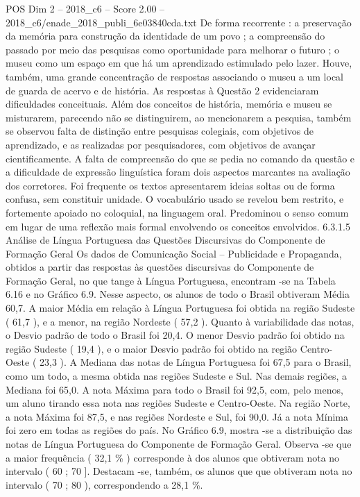 \begin{textsample}{POS Dim 2 – 2018\_c6 – Score 2.00 – 2018\_c6/enade\_2018\_publi\_6e03840cda.txt}
De forma recorrente : a preservação da memória para construção da identidade de um povo ; a compreensão do passado por meio das pesquisas como oportunidade para melhorar o futuro ; o museu como um espaço em que há um aprendizado estimulado pelo lazer.
Houve, também, uma grande concentração de respostas associando o museu a um local de guarda de acervo e de história.
As respostas à Questão 2 evidenciaram dificuldades conceituais.
Além dos conceitos de história, memória e museu se misturarem, parecendo não se distinguirem, ao mencionarem a pesquisa, também se observou falta de distinção entre pesquisas colegiais, com objetivos de aprendizado, e as realizadas por pesquisadores, com objetivos de avançar cientificamente.
A falta de compreensão do que se pedia no comando da questão e a dificuldade de expressão linguística foram dois aspectos marcantes na avaliação dos corretores.
Foi frequente os textos apresentarem ideias soltas ou de forma confusa, sem constituir unidade.
O vocabulário usado se revelou bem restrito, e fortemente apoiado no coloquial, na linguagem oral.
Predominou o senso comum em lugar de uma reflexão mais formal envolvendo os conceitos envolvidos. 6.3.1.5 Análise de Língua Portuguesa das Questões Discursivas do Componente de Formação Geral Os dados de Comunicação Social – Publicidade e Propaganda, obtidos a partir das respostas às questões discursivas do Componente de Formação Geral, no que tange à Língua Portuguesa, encontram -se na Tabela 6.16 e no Gráfico 6.9.
Nesse aspecto, os alunos de todo o Brasil obtiveram Média 60,7.
A maior Média em relação à Língua Portuguesa foi obtida na região Sudeste ( 61,7 ), e a menor, na região Nordeste ( 57,2 ).
Quanto à variabilidade das notas, o Desvio padrão de todo o Brasil foi 20,4.
O menor Desvio padrão foi obtido na região Sudeste ( 19,4 ), e o maior Desvio padrão foi obtido na região Centro-Oeste ( 23,3 ).
A Mediana das notas de Língua Portuguesa foi 67,5 para o Brasil, como um todo, a mesma obtida nas regiões Sudeste e Sul.
Nas demais regiões, a Mediana foi 65,0.
A nota Máxima para todo o Brasil foi 92,5, com, pelo menos, um aluno tirando essa nota nas regiões Sudeste e Centro-Oeste.
Na região Norte, a nota Máxima foi 87,5, e nas regiões Nordeste e Sul, foi 90,0.
Já a nota Mínima foi zero em todas as regiões do país.
No Gráfico 6.9, mostra -se a distribuição das notas de Língua Portuguesa do Componente de Formação Geral.
Observa -se que a maior frequência ( 32,1 \% ) corresponde à dos alunos que obtiveram nota no intervalo ( 60 ; 70 ].
Destacam -se, também, os alunos que que obtiveram nota no intervalo ( 70 ; 80 ), correspondendo a 28,1 \%.

\end{textsample}
